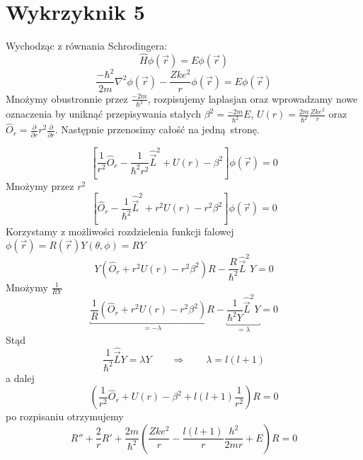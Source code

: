 \documentclass[a4paper,12pt]{article}
\begin{document}
\section{Wykrzyknik 5}
Wychodząc z równania Schrodingera:
\[
  \hat{H} \phi(\vec{r})  = E \phi (\vec{r})
\]
\[
  \frac{-\hbar^2}{2m}\nabla^2 \phi (\vec{r}) - \frac{Zke^2}{r}\phi (\vec{r}) = E
\phi (\vec{r})
\]
Mnożymy obustronnie przez $\frac{-2m}{\hbar^2}$, rozpisujemy laplasjan oraz
wprowadzamy nowe oznaczenia by uniknąć przepisywania stałych $\beta^2 =
\frac{-2m}{\hbar^2}E$, $U(r) = \frac{2m}{\hbar^2}\frac{Zke^2}{r}$ oraz
$\hat{O}_r = \frac{\partial}{\partial r}r^2 \frac{\partial}{\partial r}$.
Następnie przenosimy całość na jedną stronę.

\[
  \left[ \frac{1}{r^2} \hat{O}_r - \frac{1}{\hbar^2 r^2}\hat{\vec{L}}^2 + U(r) -
\beta^2 \right] \phi (\vec{r}) = 0
\]
Mnożymy przez $r^2$
\[
  \left[ \hat{O}_r - \frac{1}{\hbar^2}\hat{\vec{L}}^2 + r^2U(r) -
r^2 \beta^2 \right] \phi (\vec{r}) = 0
\]
Korzystamy z możliwości rozdzielenia funkcji falowej $\phi (\vec{r}) =
R(\vec{r}) Y(\theta, \phi) = R Y$
\[
  Y\left( \hat{O}_r + r^2U(r) -
  r^2 \beta^2 \right)R - \frac{R}{\hbar^2}\hat{\vec{L}}^2Y = 0
\]
Mnożymy $\frac{1}{RY}$
\[
  \underbracket{\frac{1}{R}\left( \hat{O}_r + r^2U(r) -
    r^2 \beta^2 \right)R}_{=-\lambda} - \underbracket{\frac{1}{\hbar^2
Y}\hat{\vec{L}}^2Y}_{=\lambda} = 0
\]
Stąd 
\[
  \frac{1}{\hbar^2}\hat{\vec{L}} Y = \lambda Y \qquad \Rightarrow \qquad \lambda = l(l+1)
\]
a dalej
\[
  \left(\frac{1}{r^2}\hat{O}_r + U(r) - \beta^2 + l(l+1)\frac{1}{r^2} \right)R = 0
\]
po rozpisaniu otrzymujemy
\[
  R'' + \frac{2}{r}R' + \frac{2m}{\hbar^2}\left(\frac{Zke^2}{r} -
  \frac{l(l+1)}{r} \frac{h^2}{2mr} + E \right) R = 0
\]
\end{document}
